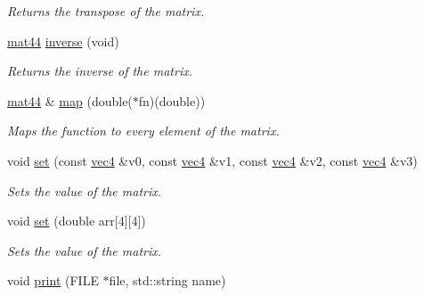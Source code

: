 \begin{DoxyCompactItemize}
\begin{DoxyCompactList}\small\item\em \-Returns the transpose of the matrix. \end{DoxyCompactList}\item 
\hypertarget{classutil_1_1math_1_1mat44_a6cfa01acbe02e768514bf6c0f77d87d9}{\hyperlink{classutil_1_1math_1_1mat44}{mat44} \hyperlink{classutil_1_1math_1_1mat44_a6cfa01acbe02e768514bf6c0f77d87d9}{inverse} (void)}\label{classutil_1_1math_1_1mat44_a6cfa01acbe02e768514bf6c0f77d87d9}

\begin{DoxyCompactList}\small\item\em \-Returns the inverse of the matrix. \end{DoxyCompactList}\item 
\hypertarget{classutil_1_1math_1_1mat44_a7d136083e4fbc69b5c3bb8fcdfa568a3}{\hyperlink{classutil_1_1math_1_1mat44}{mat44} \& \hyperlink{classutil_1_1math_1_1mat44_a7d136083e4fbc69b5c3bb8fcdfa568a3}{map} (double($\ast$fn)(double))}\label{classutil_1_1math_1_1mat44_a7d136083e4fbc69b5c3bb8fcdfa568a3}

\begin{DoxyCompactList}\small\item\em \-Maps the function to every element of the matrix. \end{DoxyCompactList}\item 
\hypertarget{classutil_1_1math_1_1mat44_abb91a08ab62c3a46e418a01fe8f46c41}{void \hyperlink{classutil_1_1math_1_1mat44_abb91a08ab62c3a46e418a01fe8f46c41}{set} (const \hyperlink{classutil_1_1math_1_1vec4}{vec4} \&v0, const \hyperlink{classutil_1_1math_1_1vec4}{vec4} \&v1, const \hyperlink{classutil_1_1math_1_1vec4}{vec4} \&v2, const \hyperlink{classutil_1_1math_1_1vec4}{vec4} \&v3)}\label{classutil_1_1math_1_1mat44_abb91a08ab62c3a46e418a01fe8f46c41}

\begin{DoxyCompactList}\small\item\em \-Sets the value of the matrix. \end{DoxyCompactList}\item 
\hypertarget{classutil_1_1math_1_1mat44_a680b26da8eae742871c3a723724832d0}{void \hyperlink{classutil_1_1math_1_1mat44_a680b26da8eae742871c3a723724832d0}{set} (double arr\mbox{[}4\mbox{]}\mbox{[}4\mbox{]})}\label{classutil_1_1math_1_1mat44_a680b26da8eae742871c3a723724832d0}

\begin{DoxyCompactList}\small\item\em \-Sets the value of the matrix. \end{DoxyCompactList}\item 
\hypertarget{classutil_1_1math_1_1mat44_af5e534762a2916626c7c49280c370bfa}{void \hyperlink{classutil_1_1math_1_1mat44_af5e534762a2916626c7c49280c370bfa}{print} (\-F\-I\-L\-E $\ast$file, std\-::string name)}\label{classutil_1_1math_1_1mat44_af5e534762a2916626c7c49280c370bfa}


\end{DoxyCompactItemize}
